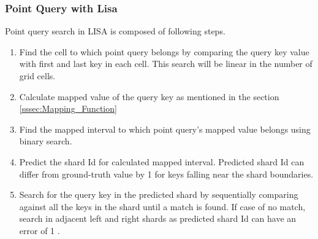 

\subsubsection{Point Query with Lisa}
Point query search in LISA is composed of following steps.

\begin{enumerate}
	\item Find the cell to which point query belongs by comparing the query key value with first and last key in each cell. This search will be linear in the number of grid cells.
	\item Calculate mapped value of the query key as mentioned in the section \ref{sssec:Mapping_Function}
	\item Find the mapped interval to which point query's mapped value belongs using binary search. 
	\item Predict the shard Id for calculated mapped interval. Predicted shard Id can differ from ground-truth value by 1 for keys falling near the shard boundaries. 
	\item Search for the query key in the predicted shard by sequentially comparing against all the keys in the shard until a match is found. If case of no match, search in adjacent left and right shards as predicted shard Id can have an error of 1 . 
\end{enumerate}
